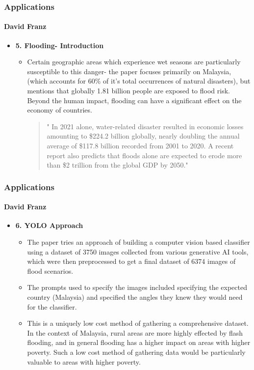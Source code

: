 \documentclass{beamer}
\newcommand{\namedframe}[3]{
  \begin{frame}
    \frametitle{#2}
    \framesubtitle{#1}
    #3
  \end{frame}
}
\begin{document}
\namedframe{David Franz}{Applications}{
\begin{itemize}
    \item \textbf{5. Flooding- Introduction}
    \begin{itemize}

        \item Certain geographic areas which experience wet seasons are particularly susceptible to this danger- the paper focuses primarily on Malaysia, (which accounts for 60\% of it's total occurrences of natural disasters), but mentions that globally 1.81 billion people are exposed to flood risk. Beyond the human impact, flooding can have a significant effect on the economy of countries.
\begin{quote}
    " In 2021 alone, water-related disaster resulted in economic losses amounting to \$224.2 billion  globally, nearly doubling the annual average of \$117.8 billion recorded from 2001 to 2020. A recent report also predicts that floods alone are expected to erode more than \$2 trillion from the global GDP by 2050."
\end{quote}
    \end{itemize}
\end{itemize}
}

\namedframe{David Franz}{Applications}{
\begin{itemize}
    \item \textbf{6. YOLO Approach}
    \begin{itemize}
        \item The paper tries an approach of building a computer vision based classifier using a dataset of 3750 images collected from various generative AI tools, which were then preprocessed to get a final dataset of 6374 images of flood scenarios. 
        \item The prompts used to specify the images included specifying the expected country (Malaysia) and specified the angles they knew they would need for the classifier. 
        \item This is a uniquely low cost method of gathering a comprehensive dataset. In the context of Malaysia, rural areas are more highly effected by flash flooding, and in general flooding has a higher impact on areas with higher poverty. Such a low cost method of gathering data would be particularly valuable to areas with higher poverty.
    \end{itemize}
\end{itemize}
}
\end{document}
